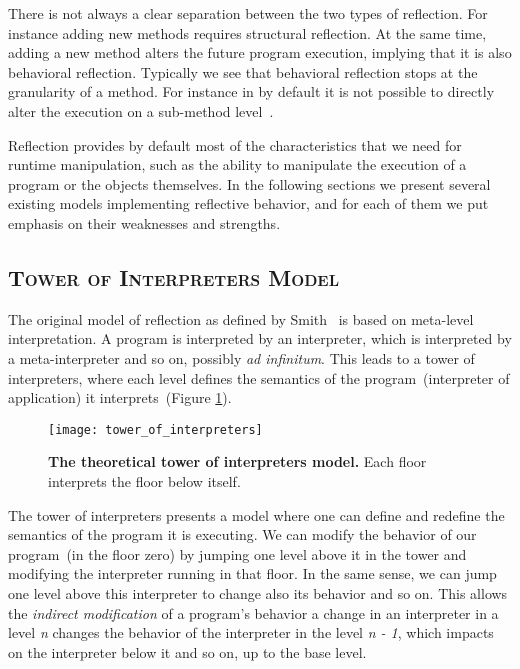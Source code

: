 There is not always a clear separation between the two types of reflection.
For instance adding new methods requires structural reflection.
At the same time, adding a new method alters the future program execution, implying that it is also behavioral reflection.
Typically we see that behavioral reflection stops at the granularity of a method.
For instance in \PH by default it is not possible to directly alter the execution on a sub-method level~\cite{Denk06a}.

Reflection provides by default most of the characteristics that we need for runtime manipulation, such as the ability to manipulate the execution of a program or the objects themselves.
In the following sections we present several existing models implementing reflective behavior, and for each of them we put emphasis on their weaknesses and strengths.

\subsection*{\textsc{Tower of Interpreters Model}}

The original model of reflection as defined by Smith~\cite{Smit82c} is based on meta-level interpretation. A program is interpreted by an interpreter, which is interpreted by a meta-interpreter and so on, possibly \emph{ad infinitum}. This leads to a tower of interpreters, where each level defines the semantics of the program~(interpreter of application) it interprets~(Figure \ref{fig:tower_of_interpreters}).

\begin{figure}[ht]
\begin{center}
\texttt{[image: tower\_of\_interpreters]}
\caption{\textbf{The theoretical tower of interpreters model.} Each floor interprets the floor below itself.\label{fig:tower_of_interpreters}
 }
\end{center}
\end{figure}

The tower of interpreters presents a model where one can define and redefine the semantics of the program it is executing. We can modify the behavior of our program~(in the floor zero) by jumping one level above it in the tower and modifying the interpreter running in that floor. In the same sense, we can jump one level above this interpreter to change also its behavior and so on. This allows the \emph{indirect modification} of a program's behavior \ie a change in an interpreter in a level \emph{n} changes the behavior of the interpreter in the level \emph{n - 1}, which impacts on the interpreter below it and so on, up to the base level.


